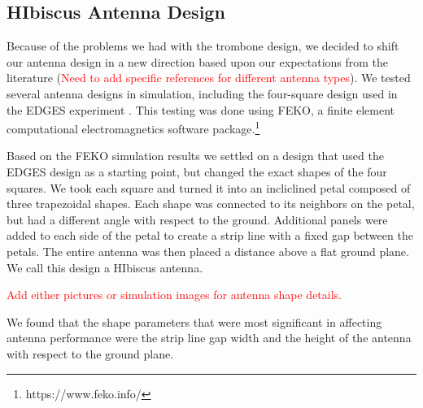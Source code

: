 \subsection{HIbiscus Antenna Design}

Because of the problems we had with the trombone design, we decided to shift our antenna design in a new direction based upon our expectations from the literature (\textcolor{red}{Need to add specific references for different antenna types}). We tested several antenna designs in simulation, including the four-square design used in the EDGES experiment \cite{rogers_2012}. This testing was done using FEKO, a finite element computational electromagnetics software package.\footnote{https://www.feko.info/}

Based on the FEKO simulation results we settled on a design that used the EDGES design as a starting point, but changed the exact shapes of the four squares. We took each square and turned it into an incliclined petal composed of three trapezoidal shapes. Each shape was connected to its neighbors on the petal, but had a different angle with respect to the ground. Additional panels were added to each side of the petal to create a strip line with a fixed gap between the petals. The entire antenna was then placed a distance above a flat ground plane. We call this design a HIbiscus antenna. 

\textcolor{red}{Add either pictures or simulation images for antenna shape details.}

We found that the shape parameters that were most significant in affecting antenna performance were the strip line gap width and the height of the antenna with respect to the ground plane. 


